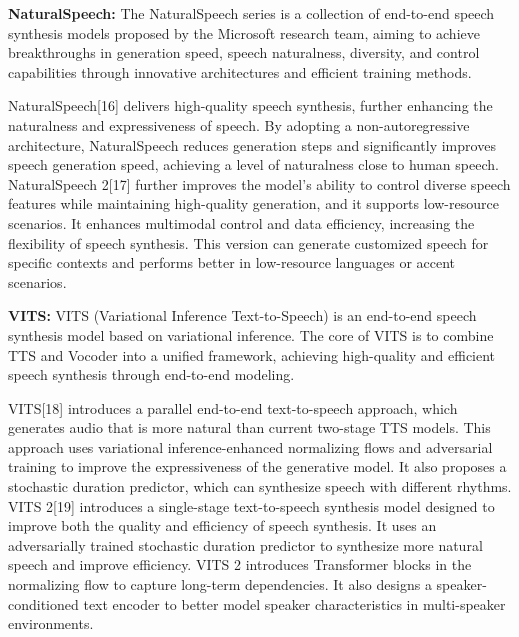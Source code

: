 \textbf{NaturalSpeech:} The NaturalSpeech series is a collection of end-to-end speech synthesis models proposed by the Microsoft research team, aiming to achieve breakthroughs in generation speed, speech naturalness, diversity, and control capabilities through innovative architectures and efficient training methods.

NaturalSpeech[16] delivers high-quality speech synthesis, further enhancing the naturalness and expressiveness of speech. By adopting a non-autoregressive architecture, NaturalSpeech reduces generation steps and significantly improves speech generation speed, achieving a level of naturalness close to human speech.
NaturalSpeech 2[17] further improves the model's ability to control diverse speech features while maintaining high-quality generation, and it supports low-resource scenarios. It enhances multimodal control and data efficiency, increasing the flexibility of speech synthesis. This version can generate customized speech for specific contexts and performs better in low-resource languages or accent scenarios.

 \textbf{VITS:} VITS (Variational Inference Text-to-Speech) is an end-to-end speech synthesis model based on variational inference. The core of VITS is to combine TTS and Vocoder into a unified framework, achieving high-quality and efficient speech synthesis through end-to-end modeling.

VITS[18] introduces a parallel end-to-end text-to-speech approach, which generates audio that is more natural than current two-stage TTS models. This approach uses variational inference-enhanced normalizing flows and adversarial training to improve the expressiveness of the generative model. It also proposes a stochastic duration predictor, which can synthesize speech with different rhythms.
VITS 2[19] introduces a single-stage text-to-speech synthesis model designed to improve both the quality and efficiency of speech synthesis. It uses an adversarially trained stochastic duration predictor to synthesize more natural speech and improve efficiency. VITS 2 introduces Transformer blocks in the normalizing flow to capture long-term dependencies. It also designs a speaker-conditioned text encoder to better model speaker characteristics in multi-speaker environments.